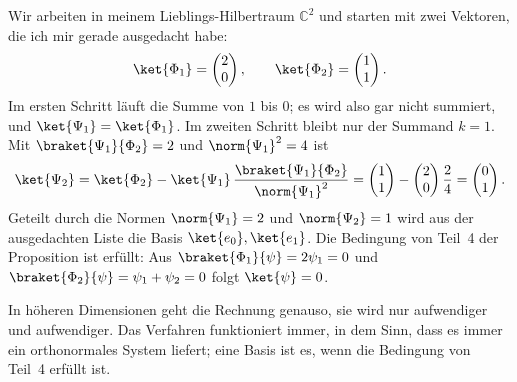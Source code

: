 \begin{example}\label{c03.ex.gram-schmidt}
  Wir arbeiten in meinem Lieblings-Hilbertraum $\mathbb{C}^2$ und starten mit zwei Vektoren, die
  ich mir gerade ausgedacht habe:
  \begin{equation}\label{c03.eq.gs-start}
    \ket{\Phi_1} = \begin{pmatrix} 2 \\ 0 \end{pmatrix},
    \qquad
    \ket{\Phi_2} = \begin{pmatrix} 1 \\ 1 \end{pmatrix} .
  \end{equation}
  Im ersten Schritt läuft die Summe von $1$ bis $0$; es wird also gar nicht summiert, und
  $\ket{\Psi_1} = \ket{\Phi_1}$. Im zweiten Schritt bleibt nur der Summand $k = 1$. Mit
  $\braket{\Psi_1}{\Phi_2} = 2$ und $\norm{\Psi_1}^2 = 4$ ist
  \begin{equation}\label{c03.eq.gs-beispiel}
    \ket{\Psi_2} = \ket{\Phi_2} - \ket{\Psi_1}\, \frac{\braket{\Psi_1}{\Phi_2}}{\norm{\Psi_1}^2}
    = \begin{pmatrix} 1 \\ 1 \end{pmatrix} - \begin{pmatrix} 2 \\ 0 \end{pmatrix} \frac{2}{4}
    = \begin{pmatrix} 0 \\ 1 \end{pmatrix} .
  \end{equation}
  Geteilt durch die Normen $\norm{\Psi_1} = 2$ und $\norm{\Psi_2} = 1$ wird aus der
  ausgedachten Liste die Basis $\ket{e_0}, \ket{e_1}$. Die Bedingung von Teil~4 der
  Proposition ist erfüllt: Aus $\braket{\Phi_1}{\psi} = 2\psi_1 = 0$ und $\braket{\Phi_2}{\psi} = \psi_1 + \psi_2 = 0$ folgt
  $\ket{\psi} = 0$.
\end{example}

In höheren Dimensionen geht die Rechnung genauso, sie wird nur aufwendiger und aufwendiger.
Das Verfahren funktioniert immer, in dem Sinn, dass es immer ein orthonormales System liefert;
eine Basis ist es, wenn die Bedingung von Teil~4 erfüllt ist.

